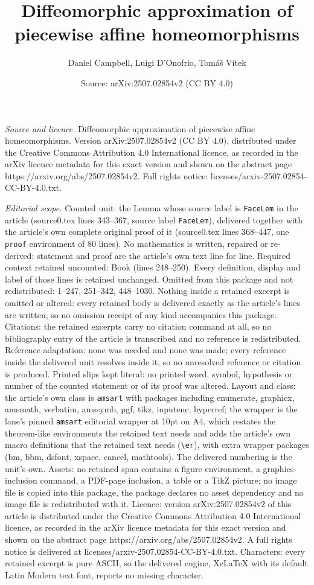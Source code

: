 \documentclass[10pt,a4paper]{amsart}
\title[Diffeomorphic approximation of piecewise affine homeomorphis]{Diffeomorphic approximation of piecewise affine homeomorphisms}
\author{Daniel Campbell, Luigi D'Onofrio, Tom\'a\v{s} V\'itek}
\date{Source: arXiv:2507.02854v2 (CC BY 4.0)}
\begin{document}
\maketitle

\noindent\emph{Source and licence.} Diffeomorphic approximation of piecewise affine homeomorphisms. Version arXiv:2507.02854v2 (CC BY 4.0), distributed under the Creative Commons Attribution 4.0 International licence, as recorded in the arXiv licence metadata for this exact version and shown on the abstract page https://arxiv.org/abs/2507.02854v2. Full rights notice: licenses/arxiv-2507.02854-CC-BY-4.0.txt.\par\smallskip

\noindent\textit{Editorial scope.} Counted unit: the Lemma whose source label is \texttt{FaceLem} in the article (source0.tex lines 343--367, source label \texttt{FaceLem}), delivered together with the article's own complete original proof of it (source0.tex lines 368--447, one \texttt{proof} environment of 80 lines). No mathematics is written, repaired or re-derived: statement and proof are the article's own text line for line. Required context retained uncounted: Book (lines 248--250). Every definition, display and label of those lines is retained unchanged. Omitted from this package and not redistributed: 1--247, 251--342, 448--1030. Nothing inside a retained excerpt is omitted or altered: every retained body is delivered exactly as the article's lines are written, so no omission receipt of any kind accompanies this package. Citations: the retained excerpts carry no citation command at all, so no bibliography entry of the article is transcribed and no reference is redistributed. Reference adaptation: none was needed and none was made; every reference inside the delivered unit resolves inside it, so no unresolved reference or citation is produced. Printed slips kept literal: no printed word, symbol, hypothesis or number of the counted statement or of its proof was altered. Layout and class: the article's own class is \texttt{amsart} with packages including enumerate, graphicx, amsmath, verbatim, amssymb, pgf, tikz, inputenc, hyperref; the wrapper is the lane's pinned \texttt{amsart} editorial wrapper at 10pt on A4, which restates the theorem-like environments the retained text needs and adds the article's own macro definitions that the retained text needs (\texttt{\textbackslash er}), with extra wrapper packages (bm, bbm, dsfont, xspace, cancel, mathtools). The delivered numbering is the unit's own. Assets: no retained span contains a figure environment, a graphics-inclusion command, a PDF-page inclusion, a table or a TikZ picture; no image file is copied into this package, the package declares no asset dependency and no image file is redistributed with it. Licence: version arXiv:2507.02854v2 of this article is distributed under the Creative Commons Attribution 4.0 International licence, as recorded in the arXiv licence metadata for this exact version and shown on the abstract page https://arxiv.org/abs/2507.02854v2. A full rights notice is delivered at licenses/arxiv-2507.02854-CC-BY-4.0.txt. Characters: every retained excerpt is pure ASCII, so the delivered engine, XeLaTeX with its default Latin Modern text font, reports no missing character.
\end{document}
